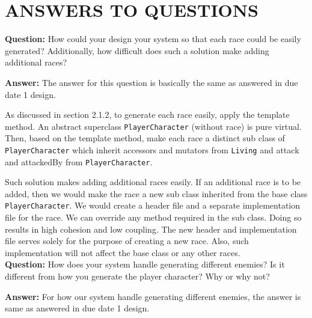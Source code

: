 \documentclass[11pt]{article}
\theoremstyle{plain} \newtheorem{theorem*}{Theorem}[subsection]
\begin{document}

\vspace{0.3 in}
\section{ANSWERS TO QUESTIONS}

\textbf{Question:}
How could your design your system so that each race could be easily generated?
Additionally, how difficult does such a solution make adding additional races? 

\textbf{Answer:}
The answer for this question is basically the same as answered in due date 1
design. 

As discussed in section 2.1.2, to generate each race easily, 
apply the template method. An abstract superclass \texttt{PlayerCharacter}
(without race) is pure virtual. Then, based on 
the template method, make each race a distinct sub class of 
\texttt{PlayerCharacter} which inherit accessors and mutators from 
\texttt{Living} and \textsf{attack} and \textsf{attackedBy} from 
\texttt{PlayerCharacter}.

Such solution makes adding additional races easily. If an additional race is to
be added, then we would make the race a new sub class inherited from the base
class \texttt{PlayerCharacter}. We would create a header file and a separate 
implementation file for the race. We can override any method required in the 
sub class. Doing so results in high cohesion and low coupling. The new header 
and implementation file serves solely for the purpose of creating a new race.
Also, such implementation will not affect the base class or any other races.\\

\textbf{Question:}
How does your system handle generating different enemies? Is it different from
how you generate the player character? Why or why not? 

\textbf{Answer:}
For how our system handle generating different enemies, the answer is same as
answered in due date 1 design. 
\end{document}
